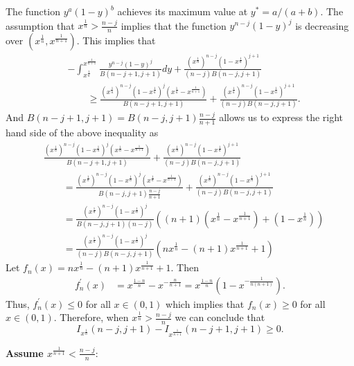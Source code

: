 \documentclass[12pt]{article}
\newcommand{\xn}{x^{\frac{1}{n}}}
\newcommand{\xnone}{x^{\frac{1}{n+1}}}
\begin{document}
The function $y^a(1-y)^b$ achieves its maximum value at $y^* = a/(a+b)$. The assumption that $\xn > \frac{n-j}{n}$ implies that the function $y^{n-j}(1 - y)^{j}$ is decreasing over $(\xn,\xnone)$. This implies that 
\begin{align*}
&-\int_{\xn}^{\xnone} \frac{y^{n-j}(1 - y)^{j}}{B(n-j+1,j+1)} dy 
  	+ \frac{\left(\xn\right)^{n-j}\left(1-\xn\right)^{j+1}}{(n-j)B(n-j,j+1)} \\
	&\qquad\geq \frac{\left(\xn\right)^{n-j}\left(1-\xn\right)^{j}(\xn  - \xnone)}{B(n-j+1,j+1)} + \frac{\left(\xn\right)^{n-j}\left(1-\xn\right)^{j+1}}{(n-j)B(n-j,j+1)}. 
\end{align*}
And $B(n-j+1,j+1) = B(n-j,j+1)\frac{n-j}{n+1}$ allows us to express the right hand side of the above inequality as
\begin{align*}
	&\frac{\left(\xn\right)^{n-j}\left(1-\xn\right)^{j}(\xn  - \xnone)}{B(n-j+1,j+1)} + \frac{\left(\xn\right)^{n-j}\left(1-\xn\right)^{j+1}}{(n-j)B(n-j,j+1)} \\
	&\qquad= \frac{\left(\xn\right)^{n-j}\left(1-\xn\right)^{j}(\xn  - \xnone)}{B(n-j,j+1)\frac{n-j}{n+1}} + \frac{\left(\xn\right)^{n-j}\left(1-\xn\right)^{j+1}}{(n-j)B(n-j,j+1)} \\
	&\qquad= \frac{\left(\xn\right)^{n-j}\left(1-\xn\right)^{j}}{B(n-j,j+1)(n-j)}\left((n+1)\left(\xn - \xnone\right) + \left(1 - \xn\right)\right) \\
		&\qquad= \frac{\left(\xn\right)^{n-j}\left(1-\xn\right)^{j}}{(n-j)B(n-j,j+1)}\left(n\xn - (n+1)\xnone + 1\right)
\end{align*}
Let $f_{n}(x) = n\xn - (n+1)\xnone + 1$. Then 
\begin{align*}
	f^{'}_{n}(x) &= x^{\frac{1-n}{n}} - x^{-\frac{n}{n+1}} = x^{\frac{1-n}{n}}(1 - x^{-\frac{1}{n(n+1)}}).
\end{align*}
Thus, $f^{'}_{n}(x) \leq 0$ for all $x \in (0,1)$ which implies that $f_n(x) \geq 0$ for all $x \in (0,1)$. Therefore, when $\xn > \frac{n-j}{n}$ we can conclude that
$$
  I_{\xn}(n-j, j+1) - I_{\xnone}(n-j+1, j+1) \geq 0.
$$

\vspace{12pt}

\noindent\textbf{Assume $\xnone < \frac{n-j}{n}$}:

\vspace{12pt}
\end{document}
